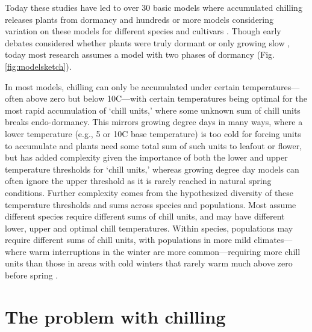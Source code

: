 \documentclass[11pt]{article}
\begin{document}
Today these studies have led to over 30 basic models where accumulated chilling releases plants from dormancy and hundreds or more models considering variation on these models for different species and cultivars \citep[][]{basler2016evaluating,hufkens2018integrated}. Though early debates considered whether plants were truly dormant or only growing slow \citep[`dormancy' or `rest' versus `quiescent';][]{considine2016language}, today most research assumes a model with two phases of dormancy (Fig. \ref{fig:modelsketch}). 

In most models, chilling can only be accumulated under certain temperatures---often above zero but below 10\degree C---with certain temperatures 
being optimal for the most rapid accumulation of `chill units,' where some unknown sum of chill units breaks endo-dormancy. This mirrors growing degree days in many ways, where a lower temperature (e.g., 5 or 10\degree C base temperature) is too cold for forcing units to accumulate and plants need some total sum of such units to leafout or flower, but has added complexity given the importance of both the lower and upper temperature thresholds 
for `chill units,' whereas growing degree day models can often ignore the upper threshold as it is rarely reached in natural spring conditions. Further complexity comes from the hypothesized diversity of these temperature thresholds and sums across species and populations. Most assume different species require different sums of chill units, and may have different lower, upper and optimal chill temperatures. Within species, populations may require different sums of chill units, with populations in more mild climates---where warm interruptions in the winter are more common---requiring more chill units than those in areas with cold winters that rarely warm much above zero before spring \citep{campbell1979,leinonen1996dependence}. 

\section*{The problem with chilling} 
\end{document}
